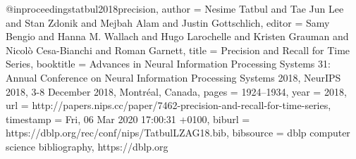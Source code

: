 @inproceedings{tatbul2018precision,
   author    = {Nesime Tatbul and
               Tae Jun Lee and
               Stan Zdonik and
               Mejbah Alam and
               Justin Gottschlich},
  editor    = {Samy Bengio and
               Hanna M. Wallach and
               Hugo Larochelle and
               Kristen Grauman and
               Nicol{\`{o}} Cesa{-}Bianchi and
               Roman Garnett},
  title     = {Precision and Recall for Time Series},
  booktitle = {Advances in Neural Information Processing Systems 31: Annual Conference
               on Neural Information Processing Systems 2018, NeurIPS 2018, 3-8 December
               2018, Montr{\'{e}}al, Canada},
  pages     = {1924--1934},
  year      = {2018},
  url       = {http://papers.nips.cc/paper/7462-precision-and-recall-for-time-series},
  timestamp = {Fri, 06 Mar 2020 17:00:31 +0100},
  biburl    = {https://dblp.org/rec/conf/nips/TatbulLZAG18.bib},
  bibsource = {dblp computer science bibliography, https://dblp.org}
}